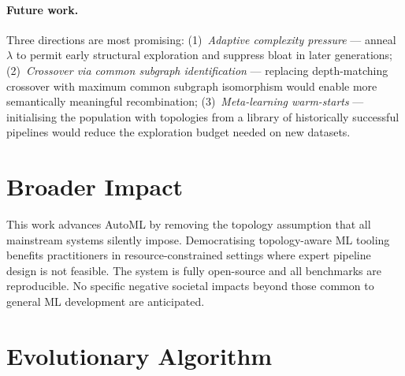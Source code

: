 \documentclass{article}
\theoremstyle{definition}
\theoremstyle{plain}
\theoremstyle{remark}
\begin{document}
\paragraph{Future work.}
Three directions are most promising:
(1)~\emph{Adaptive complexity pressure} — anneal $\lambda$ to permit early
structural exploration and suppress bloat in later generations;
(2)~\emph{Crossover via common subgraph identification} — replacing
depth-matching crossover with maximum common subgraph isomorphism would
enable more semantically meaningful recombination;
(3)~\emph{Meta-learning warm-starts} — initialising the population with
topologies from a library of historically successful pipelines would reduce
the exploration budget needed on new datasets.

\section*{Broader Impact}

This work advances AutoML by removing the topology assumption that all
mainstream systems silently impose.
Democratising topology-aware ML tooling benefits practitioners in
resource-constrained settings where expert pipeline design is not feasible.
The system is fully open-source and all benchmarks are reproducible.
No specific negative societal impacts beyond those common to general
ML development are anticipated.

\nocite{pedregosa2011scikit}
\nocite{wilcoxon1945individual}




\newpage
\appendix
\onecolumn

\section{Evolutionary Algorithm}
\label{app:alg}
\end{document}
